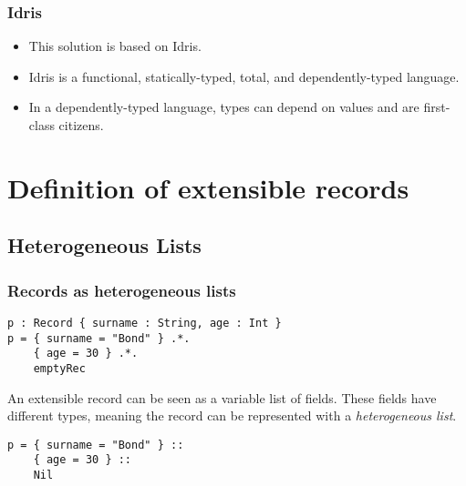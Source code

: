 \documentclass{beamer}
\begin{document}
\begin{frame}
\frametitle{Idris}

\begin{itemize}
\item This solution is based on Idris.
\item Idris is a functional, statically-typed, total, and dependently-typed language.
\item In a dependently-typed language, types can depend on values and are first-class citizens.
\end{itemize}
\end{frame}

\section{Definition of extensible records}

\subsection{Heterogeneous Lists}

\begin{frame}[fragile]
\frametitle{Records as heterogeneous lists}

\begin{example}
\begin{verbatim}
p : Record { surname : String, age : Int }
p = { surname = "Bond" } .*.
    { age = 30 } .*.
    emptyRec
\end{verbatim}
\end{example}

\pause

An extensible record can be seen as a variable list of fields. These fields have different types, meaning the record can be represented with a \textit{heterogeneous list}.

\pause

\begin{example}
\begin{verbatim}
p = { surname = "Bond" } ::
    { age = 30 } ::
    Nil
\end{verbatim}
\end{example}

\end{frame}
\end{document}
